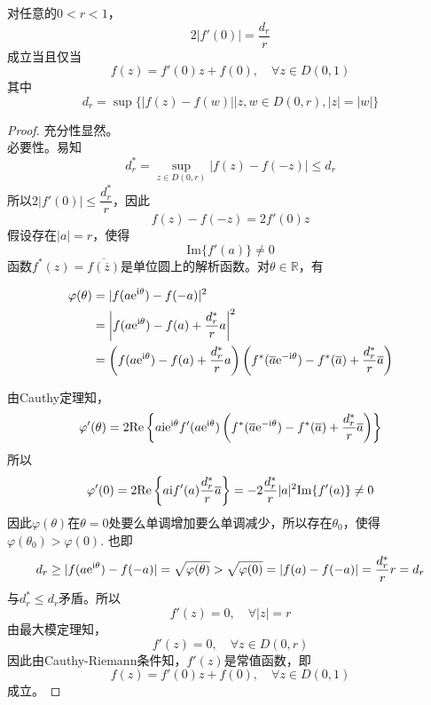 \begin{theorem}\label{theorem:complex}

    对任意的$0 < r < 1$，
    \[2|f'(0)| = \dfrac{d_r}{r}\]
    成立当且仅当
    \[f(z) = f'(0)z + f(0), \quad \forall z \in D(0, 1)\]
    其中
    \[d_r = \sup\{|f(z) - f(w)|\big| z, w \in D(0, r), |z| = |w|\}\]
    
\end{theorem}

\begin{proof}
    
    充分性显然。\\
    必要性。易知
    \[d_r^{*} = \sup\limits_{z \in D(0, r)}{|f(z) - f(-z)|} \leq d_r\]
    所以$2|f'(0)| \leq \dfrac{d_r^{*}}{r}$，因此
    \[f(z) - f(-z) = 2f'(0)z\]
    假设存在$|a| = r$，使得
    \[\mathrm{Im}\{f'(a)\} \neq 0\]
    函数$f^{*}(z) = \overline{f(\overline{z})}$是单位圆上的解析函数。对$\theta \in \mathbb{R}$，有

    \begin{align*}
        \varphi(\theta) & = |f(a\mathrm{e}^{\mathrm{i} \theta}) - f(-a)|^2 \\
        & = \left| f(a\mathrm{e}^{\mathrm{i} \theta}) - f(a) + \dfrac{d_r^{*}}{r}a \right|^2 \\
        & = \left( f(a\mathrm{e}^{\mathrm{i} \theta}) - f(a) + \dfrac{d_r^{*}}{r}a \right) \left( f^{*}(\overline{a}\mathrm{e}^{-\mathrm{i} \theta}) - f^{*}(\overline{a}) + \dfrac{d_r^{*}}{r}\overline{a} \right)
    \end{align*}

    由\textup{Cauthy}定理知，
    \[\varphi'(\theta) = 2 \mathrm{Re}\left\{ a\mathrm{i} \mathrm{e}^{\mathrm{i} \theta}f'(a\mathrm{e}^{\mathrm{i} \theta}) \left( f^{*}(\overline{a}\mathrm{e}^{-\mathrm{i} \theta}) - f^{*}(\overline{a}) + \dfrac{d_r^{*}}{r}\overline{a} \right) \right\}\]
    所以
    \[\varphi'(0) = 2 \mathrm{Re}\left\{ a\mathrm{i} f'(a)\dfrac{d_r^{*}}{r}\overline{a} \right\} = -2\dfrac{d_r^{*}}{r}|a|^2\mathrm{Im}\{f'(a)\} \neq 0\]
    因此$\varphi(\theta)$在$\theta = 0$处要么单调增加要么单调减少，所以存在$\theta_0$，使得$\varphi(\theta_0) > \varphi(0)$. 也即
    \[d_r \geq |f(a\mathrm{e}^{\mathrm{i} \theta}) - f(-a)| = \sqrt{\varphi(\theta)} > \sqrt{\varphi(0)} = |f(a) - f(-a)| = \dfrac{d_r^{*}}{r}r = d_r\]
    与$d_r^{*} \leq d_r$矛盾。所以
    \[f'(z) = 0, \quad \forall |z| = r\]
    由最大模定理知，
    \[f'(z) = 0, \quad \forall z \in D(0, r)\]
    因此由\textup{Cauthy-Riemann}条件知，$f'(z)$是常值函数，即
    \[f(z) = f'(0)z + f(0), \quad \forall z \in D(0, 1)\]
    成立。
    
\end{proof}

